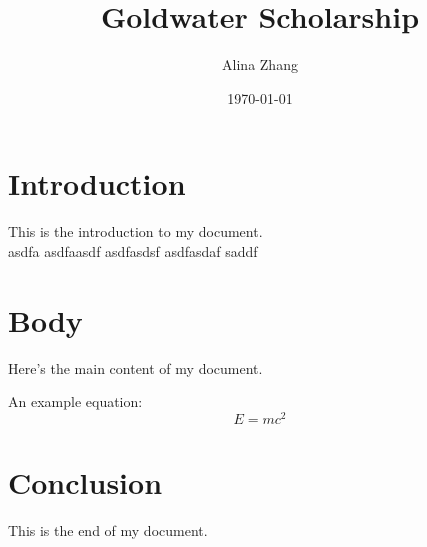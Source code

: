 \documentclass[12pt]{article}
\title{Goldwater Scholarship}
\author{Alina Zhang}
\date{\today}           %
\begin{document}
\maketitle              %

\section{Introduction}
This is the introduction to my document.
\\asdfa
asdfaasdf
asdfasdsf
asdfasdaf
saddf


\section{Body}

Here's the main content of my document. 

An example equation:
\begin{equation}
    E = mc^2
\end{equation}

\section{Conclusion}
This is the end of my document.
\end{document}

